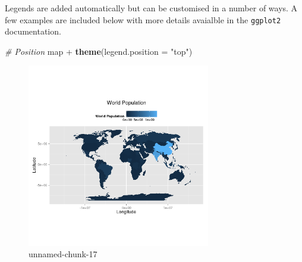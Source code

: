 \documentclass[]{article}
\newenvironment{Shaded}{}{}
\newcommand{\KeywordTok}[1]{\textcolor[rgb]{0.00,0.44,0.13}{\textbf{{#1}}}}
\newcommand{\DataTypeTok}[1]{\textcolor[rgb]{0.56,0.13,0.00}{{#1}}}
\newcommand{\StringTok}[1]{\textcolor[rgb]{0.25,0.44,0.63}{{#1}}}
\newcommand{\CommentTok}[1]{\textcolor[rgb]{0.38,0.63,0.69}{\textit{{#1}}}}
\newcommand{\NormalTok}[1]{{#1}}
\let\Oldincludegraphics\includegraphics
\renewcommand{\includegraphics}[1]{\Oldincludegraphics[width=8cm]{#1}}
\begin{document}
Legends are added automatically but can be customised in a number of
ways. A few examples are included below with more details avaialble in
the \texttt{ggplot2} documentation.

\begin{Shaded}
\begin{Highlighting}[]
\CommentTok{# Position}
\NormalTok{map + }\KeywordTok{theme}\NormalTok{(}\DataTypeTok{legend.position =} \StringTok{"top"}\NormalTok{)}
\end{Highlighting}
\end{Shaded}
\begin{figure}[htbp]
\centering
\includegraphics{figure/unnamed-chunk-171.png}
\caption{unnamed-chunk-17}
\end{figure}
\end{document}
